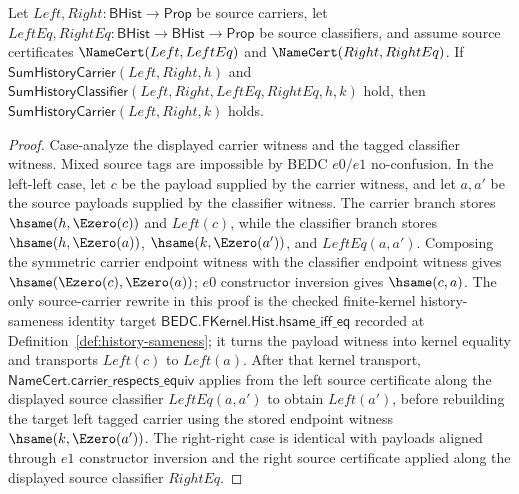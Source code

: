\begin{theorem}
\label{thm:sum-history-classifier-carrier-transport-from-namecert}
Let $Left,Right:\mathsf{BHist}\to\mathsf{Prop}$ be source carriers, let
$LeftEq,RightEq:\mathsf{BHist}\to\mathsf{BHist}\to\mathsf{Prop}$ be source
classifiers, and assume source certificates $\NameCert(Left,LeftEq)$ and
$\NameCert(Right,RightEq)$. If
$\mathsf{SumHistoryCarrier}(Left,Right,h)$ and
$\mathsf{SumHistoryClassifier}(Left,Right,LeftEq,RightEq,h,k)$ hold, then
$\mathsf{SumHistoryCarrier}(Left,Right,k)$ holds.
\end{theorem}
\begin{proof}
Case-analyze the displayed carrier witness and the tagged classifier witness.
Mixed source tags are impossible by BEDC $e0/e1$ no-confusion. In the left-left
case, let $c$ be the payload supplied by the carrier witness, and let $a,a'$ be
the source payloads supplied by the classifier witness. The carrier branch stores
$\hsame(h,\Ezero(c))$ and $Left(c)$, while the classifier branch stores
$\hsame(h,\Ezero(a))$, $\hsame(k,\Ezero(a'))$, and $LeftEq(a,a')$.
Composing the symmetric carrier endpoint witness with the classifier endpoint
witness gives $\hsame(\Ezero(c),\Ezero(a))$; $e0$ constructor inversion gives
$\hsame(c,a)$. The only source-carrier rewrite in this proof is the checked
finite-kernel history-sameness identity target
$\mathsf{BEDC.FKernel.Hist.hsame\_iff\_eq}$ recorded at
Definition~\ref{def:history-sameness}; it turns the payload witness into kernel
equality and transports $Left(c)$ to $Left(a)$. After that kernel transport,
$\mathsf{NameCert.carrier\_respects\_equiv}$ applies from the left source
certificate along the displayed source classifier $LeftEq(a,a')$ to obtain
$Left(a')$, before rebuilding the target left tagged carrier using the stored
endpoint witness $\hsame(k,\Ezero(a'))$. The right-right case is identical with
payloads aligned through $e1$ constructor inversion and the right source
certificate applied along the displayed source classifier $RightEq$.
\end{proof}


